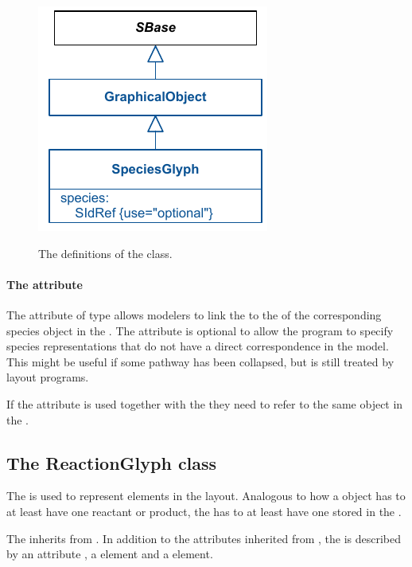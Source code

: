 \begin{figure}[!h]
\includegraphics{uml/layout-speciesglyph-uml}\\
\label{uml:speciesglyph}
\caption{The definitions of the \SpeciesGlyph class.}
\end{figure}

\paragraph{The  attribute}
The  attribute of type  allows modelers 
to link the \SpeciesGlyph to the  of the corresponding species 
object in the \Model. The  attribute is optional to allow 
the program to specify species representations that do not have a direct 
correspondence in the model. This might be useful if some pathway has 
been collapsed, but is still treated by layout programs. 

If the  attribute is used together with the  
they need to refer to the same object in the \Model.

\subsection{The ReactionGlyph class}
\label{reactionglyph-class}
The \ReactionGlyph is used to represent \Reaction elements in the 
layout. Analogous to how a \Reaction object has to at least have one reactant 
or product, the \ReactionGlyph has to at least have one 
\SpeciesReferenceGlyph stored in the \ListOfSpeciesReferenceGlyphs. 

The \ReactionGlyph inherits from \GraphicalObject. In addition to the 
attributes inherited from \GraphicalObject, the \ReactionGlyph is 
described by an attribute , a \Curve element and a 
 element. 

